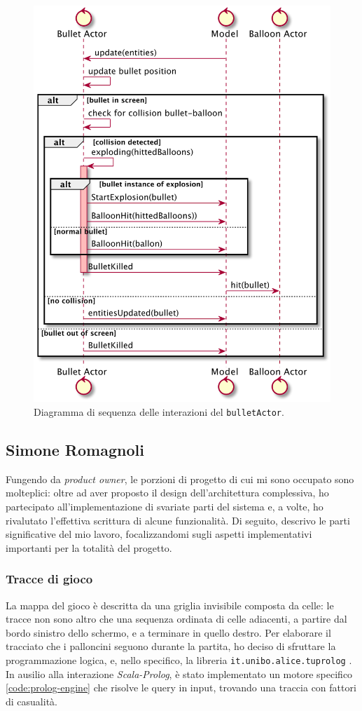 \begin{figure}[H]
    \centering
    \includegraphics[width=.7\linewidth]{img/sequence-bullet-actor}
    \caption{Diagramma di sequenza delle interazioni del \texttt{bulletActor}.}
    \label{fig:sequence-bullet-actor}
\end{figure}

\subsection{Simone Romagnoli}
Fungendo da \textit{product owner}, le porzioni di progetto di cui mi sono occupato sono molteplici: oltre ad aver
proposto il design dell'architettura complessiva, ho partecipato all'implementazione di svariate parti del sistema e, a
volte, ho rivalutato l'effettiva scrittura di alcune funzionalità. Di seguito, descrivo le parti significative del mio
lavoro, focalizzandomi sugli aspetti implementativi importanti per la totalità del progetto.

\subsubsection{Tracce di gioco}
La mappa del gioco è descritta da una griglia invisibile composta da celle: le tracce non sono altro
che una sequenza ordinata di celle adiacenti, a partire dal bordo sinistro dello schermo, e a terminare in quello
destro. Per elaborare il tracciato che i palloncini seguono durante la partita, ho deciso di sfruttare la programmazione
logica, e, nello specifico, la libreria \texttt{it.unibo.alice.tuprolog} \cite{tp}. In ausilio alla interazione
\textit{Scala-Prolog}, è stato implementato un motore specifico \ref{code:prolog-engine} che risolve le query in input,
trovando una traccia con fattori di casualità.

